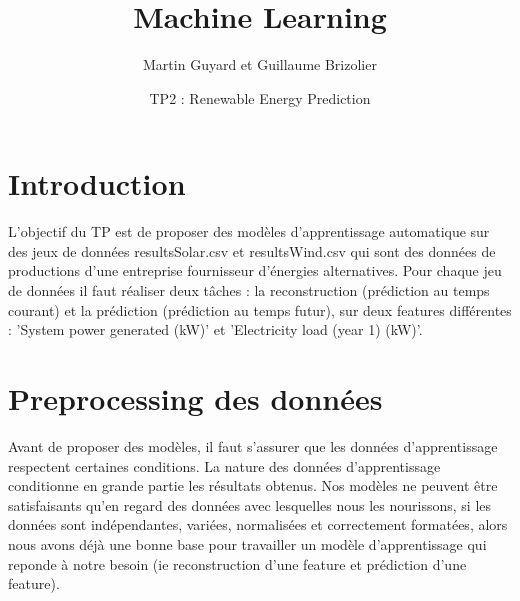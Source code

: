 \documentclass{article}
\title{Machine Learning}
\author{Martin Guyard et Guillaume Brizolier}
\date{TP2 : Renewable Energy Prediction}
\begin{document}
\maketitle

\section{Introduction}
L’objectif du TP est de proposer des modèles d’apprentissage automatique sur des jeux de données resultsSolar.csv et resultsWind.csv qui sont des données de productions d’une entreprise fournisseur d’énergies alternatives. Pour chaque jeu de données il faut réaliser deux tâches : la reconstruction (prédiction au temps courant) et la prédiction (prédiction au temps futur), sur deux features différentes : 'System power generated (kW)' et 'Electricity load (year 1) (kW)'.

\section{Preprocessing des données}
Avant de proposer des modèles, il faut s'assurer que les données d'apprentissage respectent certaines conditions. La nature des données d'apprentissage conditionne en grande partie les résultats obtenus. Nos modèles ne peuvent être satisfaisants qu'en regard des données avec lesquelles nous les nourissons, si les données sont indépendantes, variées, normalisées et correctement formatées, alors nous avons déjà une bonne base pour travailler un modèle d'apprentissage qui reponde à notre besoin (ie reconstruction d'une feature et prédiction d'une feature).
\end{document}
